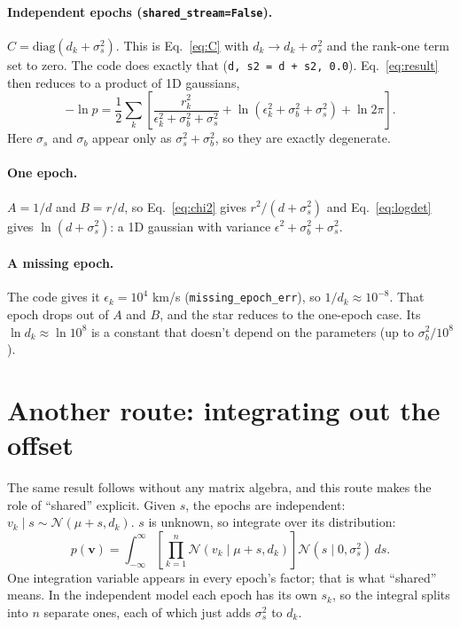 \documentclass[11pt]{article}
\newcommand{\bv}{\mathbf{v}}
\begin{document}
\paragraph{Independent epochs (\texttt{shared\_stream=False}).}
$C = \mathrm{diag}(d_k + \sigma_s^2)$.
This is Eq.~\eqref{eq:C} with $d_k \to d_k + \sigma_s^2$ and the rank-one term set to zero.
The code does exactly that (\texttt{d, s2 = d + s2, 0.0}).
Eq.~\eqref{eq:result} then reduces to a product of 1D gaussians,
\begin{equation*}
  -\ln p = \frac{1}{2}\sum_k\left[\frac{r_k^2}{\epsilon_k^2 + \sigma_b^2 + \sigma_s^2} + \ln(\epsilon_k^2 + \sigma_b^2 + \sigma_s^2) + \ln 2\pi\right].
\end{equation*}
Here $\sigma_s$ and $\sigma_b$ appear only as $\sigma_s^2 + \sigma_b^2$, so they are exactly degenerate.

\paragraph{One epoch.}
$A = 1/d$ and $B = r/d$, so Eq.~\eqref{eq:chi2} gives $r^2/(d + \sigma_s^2)$ and Eq.~\eqref{eq:logdet} gives $\ln(d + \sigma_s^2)$:
a 1D gaussian with variance $\epsilon^2 + \sigma_b^2 + \sigma_s^2$.

\paragraph{A missing epoch.}
The code gives it $\epsilon_k = 10^4$ km/s (\texttt{missing\_epoch\_err}), so $1/d_k \approx 10^{-8}$.
That epoch drops out of $A$ and $B$, and the star reduces to the one-epoch case.
Its $\ln d_k \approx \ln 10^8$ is a constant that doesn't depend on the parameters
(up to $\sigma_b^2/10^8$).

\section{Another route: integrating out the offset}
The same result follows without any matrix algebra, and this route makes the role of ``shared'' explicit.
Given $s$, the epochs are independent: $v_k \mid s \sim \mathcal{N}(\mu + s, d_k)$.
$s$ is unknown, so integrate over its distribution:
\begin{equation}
  p(\bv) = \int_{-\infty}^{\infty} \left[\prod_{k=1}^{n}\mathcal{N}(v_k \mid \mu + s, d_k)\right]\mathcal{N}(s\mid 0, \sigma_s^2)\, ds .
\end{equation}
One integration variable appears in every epoch's factor; that is what ``shared'' means.
In the independent model each epoch has its own $s_k$, so the integral splits into $n$ separate ones,
each of which just adds $\sigma_s^2$ to $d_k$.
\end{document}
